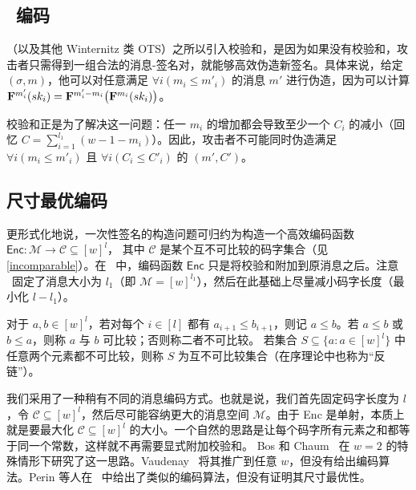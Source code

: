 \subsection{\WOTSP~编码}

\WOTSP（以及其他 Winternitz 类 OTS）之所以引入校验和，是因为如果没有校验和，攻击者只需得到一组合法的消息-签名对，就能够高效伪造新签名。具体来说，给定 $(\sigma,m)$，他可以对任意满足 $\forall i(m_i\leq m'_i)$ 的消息 $m'$ 进行伪造，因为可以计算
$\mathbf{F}^{m'_i}(sk_i)=\mathbf{F}^{m'_i-m_i}\big( \mathbf{F}^{m_i}(sk_i)\big)$。

校验和正是为了解决这一问题：任一 $m_i$ 的增加都会导致至少一个 $C_i$ 的减小（回忆 $C=\sum_{i=1}^{l_1}(w-1-m_i)$）。因此，攻击者不可能同时伪造满足 $\forall i(m_i\leq m'_i)$ 且 $\forall i(C_i\leq C'_i)$ 的 $(m',C')$。

\subsection{尺寸最优编码}

更形式化地说，一次性签名的构造问题可归约为构造一个高效编码函数
$\mathsf{Enc}:\mathcal{M}\rightarrow \mathcal{C}\subseteq[w]^{l}$，
其中 $\mathcal{C}$ 是某个互不可比较的码字集合（见 \cref{incomparable}）。在 \WOTSP\ 中，编码函数 $\mathsf{Enc}$ 只是将校验和附加到原消息之后。注意 \WOTSP\ 固定了消息大小为 $l_1$（即 $\mathcal{M}=[w]^{l_1}$），然后在此基础上尽量减小码字长度（最小化 $l-l_1$）。

\begin{definition}[(不)可比较性]\label{incomparable}
对于 $a,b\in[w]^l$，若对每个 $i \in [l]$ 都有 $a_{i+1}\leq b_{i+1}$，则记 $a \leq b$。若 $a\leq b$ 或 $b\leq a$，则称 $a$ 与 $b$ 可比较；否则称二者不可比较。
若集合 $S\subseteq\{a:a\in[w]^l\}$ 中任意两个元素都不可比较，则称 $S$ 为互不可比较集合（在序理论中也称为“反链”）。
\end{definition}

我们采用了一种稍有不同的消息编码方式。也就是说，我们首先固定码字长度为 $l$，令 $\mathcal{C}\subseteq[w]^{l}$，然后尽可能容纳更大的消息空间 $\mathcal{M}$。由于 {\sf Enc} 是单射，本质上就是要最大化 $\mathcal{C}\subseteq[w]^{l}$ 的大小。一个自然的思路是让每个码字所有元素之和都等于同一个常数，这样就不再需要显式附加校验和。
Bos 和 Chaum~\cite{C:BosCha92} 在 $w=2$ 的特殊情形下研究了这一思路。Vaudenay~\cite{vaudenay1993one} 将其推广到任意 $w$，但没有给出编码算法。Perin 等人在~\cite{perin2021improved} 中给出了类似的编码算法，但没有证明其尺寸最优性。

